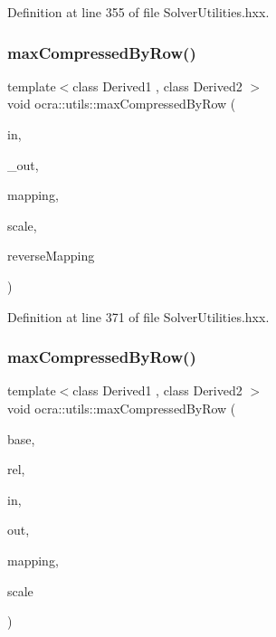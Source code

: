 Definition at line 355 of file Solver\+Utilities.\+hxx.

\hypertarget{namespaceocra_1_1utils_a6216ad7fe2fb3ce0e894167f8f7d08b8}{}\label{namespaceocra_1_1utils_a6216ad7fe2fb3ce0e894167f8f7d08b8} 
\subsubsection{\texorpdfstring{max\+Compressed\+By\+Row()}{maxCompressedByRow()}\hspace{0.1cm}{\footnotesize\ttfamily [1/2]}}
{\footnotesize\ttfamily template$<$class Derived1 , class Derived2 $>$ \\
void ocra\+::utils\+::max\+Compressed\+By\+Row (\begin{DoxyParamCaption}\item[{const Matrix\+Base$<$ Derived1 $>$ \&}]{in,  }\item[{Matrix\+Base$<$ Derived2 $>$ const \&}]{\+\_\+out,  }\item[{const std\+::vector$<$ int $>$ \&}]{mapping,  }\item[{double}]{scale,  }\item[{bool}]{reverse\+Mapping }\end{DoxyParamCaption})\hspace{0.3cm}{\ttfamily [inline]}}



Definition at line 371 of file Solver\+Utilities.\+hxx.

\hypertarget{namespaceocra_1_1utils_a0d2b985e493c0d62782921b92d0f92a9}{}\label{namespaceocra_1_1utils_a0d2b985e493c0d62782921b92d0f92a9} 
\subsubsection{\texorpdfstring{max\+Compressed\+By\+Row()}{maxCompressedByRow()}\hspace{0.1cm}{\footnotesize\ttfamily [2/2]}}
{\footnotesize\ttfamily template$<$class Derived1 , class Derived2 $>$ \\
void ocra\+::utils\+::max\+Compressed\+By\+Row (\begin{DoxyParamCaption}\item[{const \hyperlink{classocra_1_1Variable}{Variable} \&}]{base,  }\item[{const \hyperlink{classocra_1_1Variable}{Variable} \&}]{rel,  }\item[{const Matrix\+Base$<$ Derived1 $>$ \&}]{in,  }\item[{Matrix\+Base$<$ Derived2 $>$ const \&}]{out,  }\item[{std\+::vector$<$ int $>$ \&}]{mapping,  }\item[{double}]{scale }\end{DoxyParamCaption})\hspace{0.3cm}{\ttfamily [inline]}}



